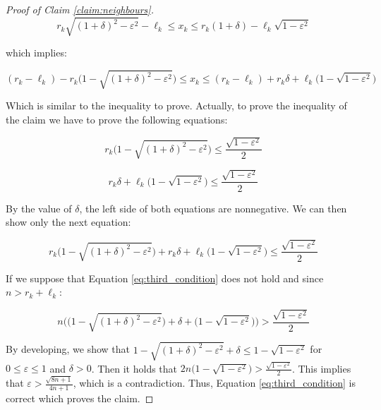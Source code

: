 {\begin{proof}[Proof of Claim \ref{claim:neighbours}]
  $$r_k \sqrt{(1 + \delta)^2 - \varepsilon^2} - \ell_k \leqslant x_k \leqslant r_k(1 + \delta) - \ell_k \sqrt{1 - \varepsilon^2}$$

  which implies:

  $$(r_k - \ell_k) - r_k \Big(1 -\sqrt{(1 + \delta)^2 - \varepsilon^2}\Big) \leqslant x_k \leqslant (r_k - \ell_k) + r_k\delta + \ell_k \Big(1 - \sqrt{1 - \varepsilon^2} \Big)$$

  Which is similar to the inequality to prove. Actually, to prove the inequality of the claim we have to prove the following equations:

  \begin{equation}\label{eq:first_condition}
    r_k \Big(1 -\sqrt{(1 + \delta)^2 - \varepsilon^2}\Big) \leqslant \frac{\sqrt{1 - \varepsilon^2}}{2}
  \end{equation}

  \begin{equation}\label{eq:second_condition}
    r_k\delta + \ell_k \Big(1 - \sqrt{1 - \varepsilon^2} \Big) \leqslant \frac{\sqrt{1 - \varepsilon^2}}{2}
  \end{equation}

  By the value of $\delta$, the left side of both equations are nonnegative. We can then show only the next equation:

  \begin{equation}\label{eq:third_condition}
      r_k \Big(1 -\sqrt{(1 + \delta)^2 - \varepsilon^2}\Big) + r_k\delta + \ell_k \Big(1 - \sqrt{1 - \varepsilon^2} \Big) \leqslant \frac{\sqrt{1 - \varepsilon^2}}{2}
  \end{equation}

  If we suppose that Equation \ref{eq:third_condition} does not hold and since $n > r_k + \ell_k$:

  \begin{equation}\label{eq:fourth_condition}
      n \Big(\Big(1 -\sqrt{(1 + \delta)^2 - \varepsilon^2}\Big) + \delta + \Big(1 - \sqrt{1 - \varepsilon^2} \Big)\Big) > \frac{\sqrt{1 - \varepsilon^2}}{2}
  \end{equation}

  By developing, we show that $1 - \sqrt{(1 + \delta)^2 - \varepsilon^2} + \delta \leqslant 1 - \sqrt{1 - \varepsilon^2}$ for $0 \leqslant \varepsilon \leqslant 1$ and $\delta > 0$. Then it holds that $2n \Big(1 - \sqrt{1 - \varepsilon^2} \Big) > \frac{\sqrt{1 - \varepsilon^2}}{2}$. This implies that $\varepsilon > \frac{\sqrt{8n + 1}}{4n + 1}$, which is a contradiction. Thus, Equation \ref{eq:third_condition} is correct which proves the claim.
\end{proof}

}
